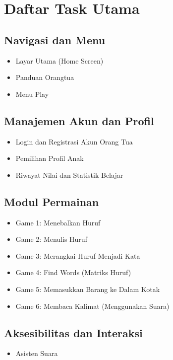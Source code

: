 \documentclass[12pt,a4paper]{report}
\begin{document}

\chapter*{Daftar Task Utama}

\section*{Navigasi dan Menu}
\begin{itemize}
\item Layar Utama (Home Screen)
\item Panduan Orangtua
\item Menu Play
\end{itemize}

\section*{Manajemen Akun dan Profil}
\begin{itemize}
\item Login dan Registrasi Akun Orang Tua
\item Pemilihan Profil Anak
\item Riwayat Nilai dan Statistik Belajar
\end{itemize}

\section*{Modul Permainan}
\begin{itemize}
\item Game 1: Menebalkan Huruf
\item Game 2: Menulis Huruf
\item Game 3: Merangkai Huruf Menjadi Kata
\item Game 4: Find Words (Matriks Huruf)
\item Game 5: Memasukkan Barang ke Dalam Kotak
\item Game 6: Membaca Kalimat (Menggunakan Suara)
\end{itemize}

\section*{Aksesibilitas dan Interaksi}
\begin{itemize}
\item Asisten Suara
\end{itemize}
\end{document}

